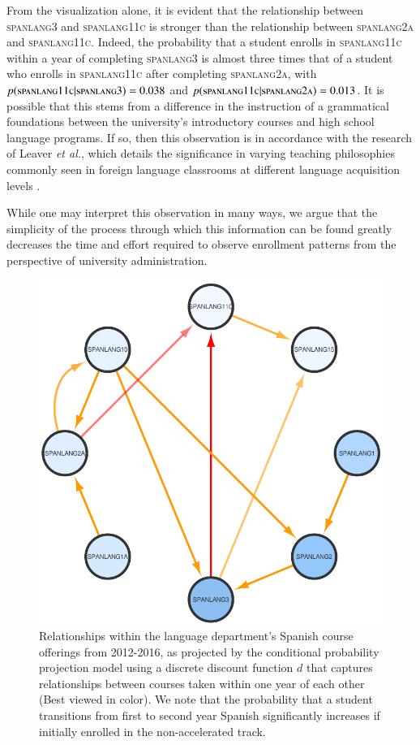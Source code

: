 \documentclass{sigchi}
\begin{document}
From the visualization alone, it is evident that the relationship between \textsc{spanlang3} and \textsc{spanlang11c} is stronger than the relationship between \textsc{spanlang2a} and \textsc{spanlang11c}. Indeed, the probability that a student enrolls in \textsc{spanlang11c} within a year of completing \textsc{spanlang3} is almost three times that of a student who enrolls in \textsc{spanlang11c} after completing \textsc{spanlang2a}, with $p(\textsc{spanlang11c}|\textsc{spanlang3}) = 0.038$ and $p(\textsc{spanlang11c}|\textsc{spanlang2a}) = 0.013$. It is possible that this stems from a difference in the instruction of a grammatical foundations between the university's introductory courses and high school language programs. If so, then this observation is in accordance with the research of Leaver \textit{et al.}, which details the significance in varying teaching philosophies commonly seen in foreign language classrooms at different language acquisition levels \cite{Leaver2002}.

While one may interpret this observation in many ways, we argue that the simplicity of the process through which this information can be found greatly decreases the time and effort required to observe enrollment patterns from the perspective of university administration.

\begin{figure}[h]
    \centering
    \includegraphics[width=\columnwidth]{final-spanlang.pdf}  
    \caption{Relationships within the language department's Spanish course offerings from 2012-2016, as projected by the conditional probability projection model using a discrete discount function $d$ that captures relationships between courses taken within one year of each other (Best viewed in color). We note that the probability that a student transitions from first to second year Spanish significantly increases if initially enrolled in the non-accelerated track.}
    \label{fig:spanlang}
\end{figure}
\end{document}
